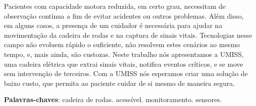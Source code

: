\begin{resumo}

Pacientes com capacidade motora reduzida, em certo grau, necessitam de
observação contínua a fim de evitar acidentes ou outros problemas. Além
disso, em alguns casos, a presença de um cuidador é necessária para ajudar na
movimentação da cadeira de rodas e na captura de sinais vitais.
Tecnologias nesse campo não evoluem rápido o suficiente, não resolvem estes
cenários ao mesmo tempo, e, mais ainda, são custozas.
Neste trabalho nós apresentamos a UMISS, uma cadeira elétrica que extrai sinais
vitais, notifica eventos críticos, e se move sem intervenção de terceiros.
Com a UMISS nós esperamos criar uma solução de baixo custo, que permita ao
paciente cuidar de si mesmo de maneira segura.

 \vspace{\onelineskip}
    
 \noindent
 \textbf{Palavras-chaves}: cadeira de rodas. acessível. monitoramento. sensores.
\end{resumo}

